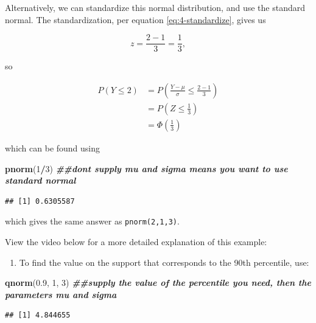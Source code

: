 \documentclass[
]{book}
\newenvironment{Shaded}{\begin{snugshade}}{\end{snugshade}}
\newcommand{\DecValTok}[1]{\textcolor[rgb]{0.00,0.00,0.81}{#1}}
\newcommand{\DocumentationTok}[1]{\textcolor[rgb]{0.56,0.35,0.01}{\textbf{\textit{#1}}}}
\newcommand{\FloatTok}[1]{\textcolor[rgb]{0.00,0.00,0.81}{#1}}
\newcommand{\FunctionTok}[1]{\textcolor[rgb]{0.13,0.29,0.53}{\textbf{#1}}}
\newcommand{\NormalTok}[1]{#1}
\newcommand{\SpecialCharTok}[1]{\textcolor[rgb]{0.81,0.36,0.00}{\textbf{#1}}}
\providecommand{\tightlist}{%
  \setlength{\itemsep}{0pt}\setlength{\parskip}{0pt}}
\begin{document}
Alternatively, we can standardize this normal distribution, and use the standard normal. The standardization, per equation \eqref{eq:4-standardize}, gives us

\[
z = \frac{2-1}{3} = \frac{1}{3},
\]

so

\[
\begin{split}
P(Y \leq 2) &= P(\frac{Y-\mu}{\sigma} \leq \frac{2-1}{3}) \\
            &= P(Z \leq \frac{1}{3}) \\
            &= \Phi(\frac{1}{3})
\end{split}
\]

which can be found using

\begin{Shaded}
\begin{Highlighting}[]
\FunctionTok{pnorm}\NormalTok{(}\DecValTok{1}\SpecialCharTok{/}\DecValTok{3}\NormalTok{) }\DocumentationTok{\#\#don\textquotesingle{}t supply mu and sigma means you want to use standard normal}
\end{Highlighting}
\end{Shaded}

\begin{verbatim}
## [1] 0.6305587
\end{verbatim}

which gives the same answer as \texttt{pnorm(2,1,3)}.

View the video below for a more detailed explanation of this example:

\begin{enumerate}
\def\labelenumi{\arabic{enumi}.}
\setcounter{enumi}{2}
\tightlist
\item
  To find the value on the support that corresponds to the 90th percentile, use:
\end{enumerate}

\begin{Shaded}
\begin{Highlighting}[]
\FunctionTok{qnorm}\NormalTok{(}\FloatTok{0.9}\NormalTok{, }\DecValTok{1}\NormalTok{, }\DecValTok{3}\NormalTok{) }\DocumentationTok{\#\#supply the value of the percentile you need, then the parameters mu and sigma}
\end{Highlighting}
\end{Shaded}

\begin{verbatim}
## [1] 4.844655
\end{verbatim}
\end{document}

